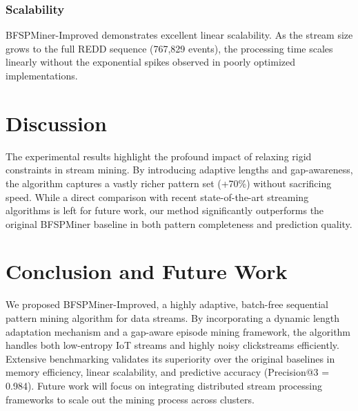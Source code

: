 \documentclass[conference]{IEEEtran}
\begin{document}
\subsubsection{Scalability}
BFSPMiner-Improved demonstrates excellent linear scalability. As the stream size grows to the full REDD sequence (767,829 events), the processing time scales linearly without the exponential spikes observed in poorly optimized implementations.

\section{Discussion}
\label{sec:discussion}
The experimental results highlight the profound impact of relaxing rigid constraints in stream mining. By introducing adaptive lengths and gap-awareness, the algorithm captures a vastly richer pattern set (+70\%) without sacrificing speed. While a direct comparison with recent state-of-the-art streaming algorithms is left for future work, our method significantly outperforms the original BFSPMiner baseline in both pattern completeness and prediction quality.

\section{Conclusion and Future Work}
\label{sec:conclusion}
We proposed BFSPMiner-Improved, a highly adaptive, batch-free sequential pattern mining algorithm for data streams. By incorporating a dynamic length adaptation mechanism and a gap-aware episode mining framework, the algorithm handles both low-entropy IoT streams and highly noisy clickstreams efficiently. Extensive benchmarking validates its superiority over the original baselines in memory efficiency, linear scalability, and predictive accuracy (Precision@3 = 0.984). Future work will focus on integrating distributed stream processing frameworks to scale out the mining process across clusters.



\end{document}
